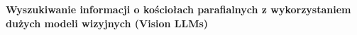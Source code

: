 \documentclass{book}
\begin{document}
\begin{titlepage}
\begin{center}

\vspace{72pt}

\textbf{Wyszukiwanie informacji o kościołach parafialnych z wykorzystaniem dużych modeli wizyjnych (Vision LLMs)}

\vspace{168pt}
\end{center}

\vspace{60pt}

\end{titlepage}

\tableofcontents

\end{document}
